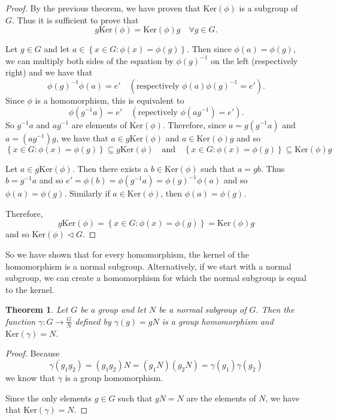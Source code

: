\documentclass[
]{book}
\newtheorem{theorem}{Theorem}[chapter]
\theoremstyle{definition}
\theoremstyle{definition}
\theoremstyle{definition}
\theoremstyle{definition}
\theoremstyle{remark}
\begin{document}
\begin{proof}
By the previous theorem, we have proven that \(\mbox{Ker}(\phi)\) is a subgroup of \(G\). Thus it is sufficient to prove that \[g \mbox{Ker}(\phi)= \mbox{Ker}(\phi) g \quad \forall g\in G.\]

Let \(g\in G\) and let \(a \in \left\{ x \in G : \phi(x)= \phi(g) \right\}\). Then since \(\phi(a)=\phi(g)\), we can multiply both sides of the equation by \(\phi(g)^{-1}\) on the left (respectively right) and we have that
\[\phi(g)^{-1} \phi(a) = e' \quad \left(\mbox{respectively }  \phi(a) \phi(g)^{-1} =e' \right).\]
Since \(\phi\) is a homomorphism, this is equivalent to
\[\phi(g^{-1} a) =e' \quad \left( \mbox{repectively }  \phi( a g^{-1}) =e' \right) .\]
So \(g^{-1}a\) and \(a g^{-1}\) are elements of \(\mbox{Ker}(\phi)\). Therefore, since \(a= g (g^{-1}a)\) and \(a= (a g^{-1})g\), we have that \(a \in g \mbox{Ker}(\phi)\) and \(a \in \mbox{Ker}(\phi) g\) and so
\[\left\{ x \in G : \phi(x)= \phi(g)  \right\} \subseteq g \mbox{Ker}(\phi) \quad \mbox{and} \quad \left\{ x \in G : \phi(x)= \phi(g)  \right\} \subseteq \mbox{Ker}(\phi) g\]

Let \(a \in g \mbox{Ker}(\phi)\). Then there exists a \(b\in \mbox{Ker}(\phi)\) such that \(a=gb\). Thus \(b=g^{-1}a\) and so \(e'=\phi(b) = \phi(g^{-1} a) = \phi(g)^{-1} \phi(a)\) and so \(\phi(a)=\phi(g)\). Similarly if \(a \in \mbox{Ker}(\phi)\), then \(\phi(a)=\phi(g)\).

Therefore, \[g \mbox{Ker}(\phi) =   \left\{ x \in G : \phi(x)= \phi(g)  \right\} = \mbox{Ker}(\phi) g\] and so \(\mbox{Ker}(\phi) \vartriangleleft G\).
\end{proof}

So we have shown that for every homomorphism, the kernel of the homomorphism is a normal subgroup. Alternatively, if we start with a normal subgroup, we can create a homomorphism for which the normal subgroup is equal to the kernel.

\begin{theorem}
Let \(G\) be a group and let \(N\) be a normal subgroup of \(G\). Then the function \(\gamma: G \rightarrow \frac{G}{N}\) defined by \(\gamma(g)=gN\) is a group homomorphism and \(\mbox{Ker}(\gamma) = N\).
\end{theorem}

\begin{proof}
Because \[\gamma(g_1 g_2) = (g_1 g_2) N = \left(g_1 N\right) \left(g_2 N\right) = \gamma(g_1) \gamma(g_2)\] we know that \(\gamma\) is a group homomorphism.

Since the only elements \(g \in G\) such that \(gN=N\) are the elements of \(N\), we have that \(\mbox{Ker}(\gamma)=N\).
\end{proof}
\end{document}
